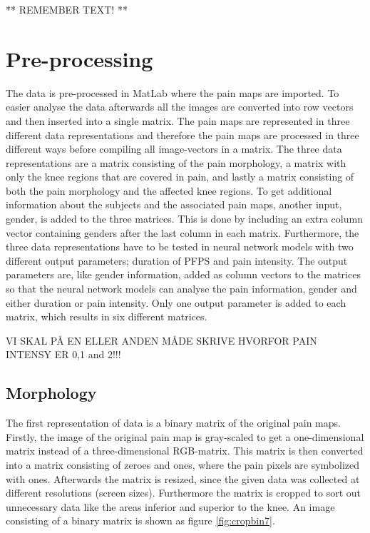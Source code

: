 ** REMEMBER TEXT! **

\section{Pre-processing}
The data is pre-processed in MatLab where the pain maps are imported. To easier analyse the data afterwards all the images are converted into row vectors and then inserted into a single matrix. The pain maps are represented in three different data representations and therefore the pain maps are processed in three different ways before compiling all image-vectors in a matrix. 
The three data representations are a matrix consisting of the pain morphology, a matrix with only the knee regions that are covered in pain, and lastly a matrix consisting of both the pain morphology and the affected knee regions. 
To get additional information about the subjects and the associated pain maps, another input, gender, is added to the three matrices. This is done by including an extra column vector containing genders after the last column in each matrix. 
Furthermore, the three data representations have to be tested in neural network models with two different output parameters; duration of PFPS and pain intensity. The output parameters are, like gender information, added as column vectors to the matrices so that the neural network models can analyse the pain information, gender and either duration or pain intensity. Only one output parameter is added to each matrix, which results in six different matrices.

VI SKAL PÅ EN ELLER ANDEN MÅDE SKRIVE HVORFOR PAIN INTENSY ER 0,1 and 2!!!

\subsection{Morphology} \label{sec:Morph}
The first representation of data is a binary matrix of the original pain maps. 
Firstly, the image of the original pain map is gray-scaled to get a one-dimensional matrix instead of a three-dimensional RGB-matrix. This matrix is then converted into a matrix consisting of zeroes and ones, where the pain pixels are symbolized with ones. Afterwards the matrix is resized, since the given data was collected at different resolutions (screen sizes). Furthermore the matrix is cropped to sort out unnecessary data like the areas inferior and superior to the knee. An image consisting of a binary matrix is shown as figure \ref{fig:cropbin7}.

